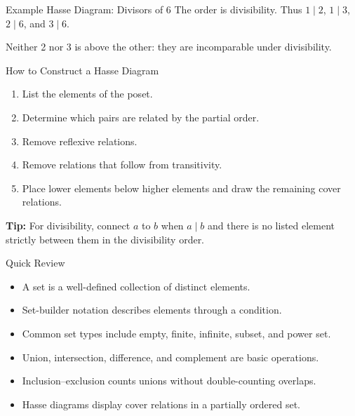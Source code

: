 \documentclass[aspectratio=169,11pt]{beamer}
\begin{document}
\begin{frame}{Example Hasse Diagram: Divisors of 6}
The order is divisibility. Thus \(1\mid2\), \(1\mid3\), \(2\mid6\), and
\(3\mid6\).

\begin{center}
\end{center}

Neither 2 nor 3 is above the other: they are incomparable under divisibility.
\end{frame}

\begin{frame}{How to Construct a Hasse Diagram}
\begin{enumerate}
  \item List the elements of the poset.
  \item Determine which pairs are related by the partial order.
  \item Remove reflexive relations.
  \item Remove relations that follow from transitivity.
  \item Place lower elements below higher elements and draw the remaining
        cover relations.
\end{enumerate}

\textbf{Tip:} For divisibility, connect \(a\) to \(b\) when \(a\mid b\)
and there is no listed element strictly between them in the divisibility
order.
\end{frame}

\begin{frame}{Quick Review}
\begin{itemize}
  \item A set is a well-defined collection of distinct elements.
  \item Set-builder notation describes elements through a condition.
  \item Common set types include empty, finite, infinite, subset, and power set.
  \item Union, intersection, difference, and complement are basic operations.
  \item Inclusion--exclusion counts unions without double-counting overlaps.
  \item Hasse diagrams display cover relations in a partially ordered set.
\end{itemize}
\end{frame}
\end{document}
